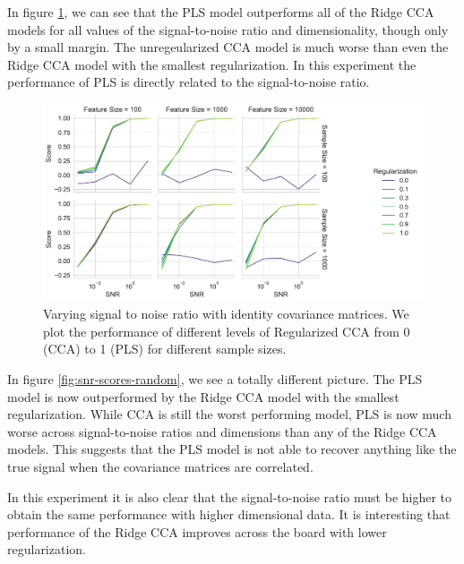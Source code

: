 In figure \ref{fig:snr-scores-identity}, we can see that the PLS model outperforms all of the Ridge CCA models for all values of the signal-to-noise ratio and dimensionality, though only by a small margin.
The unregeularized CCA model is much worse than even the Ridge CCA model with the smallest regularization.
In this experiment the performance of PLS is directly related to the signal-to-noise ratio.

\begin{figure}
    \centering
    \includegraphics[width=\linewidth]{figures/brain_behaviour_sim/snr_vs_scores_facet_identity}
    \caption{Varying signal to noise ratio with identity covariance matrices. We plot the performance of different levels of Regularized CCA from 0 (CCA) to 1 (PLS) for different sample sizes. }\label{fig:snr-scores-identity}
\end{figure}

In figure \ref{fig:snr-scores-random}, we see a totally different picture.
The PLS model is now outperformed by the Ridge CCA model with the smallest regularization.
While CCA is still the worst performing model, PLS is now much worse across signal-to-noise ratios and dimensions than any of the Ridge CCA models.
This suggests that the PLS model is not able to recover anything like the true signal when the covariance matrices are correlated.


In this experiment it is also clear that the signal-to-noise ratio must be higher to obtain the same performance with higher dimensional data.
It is interesting that performance of the Ridge CCA improves across the board with lower regularization.


